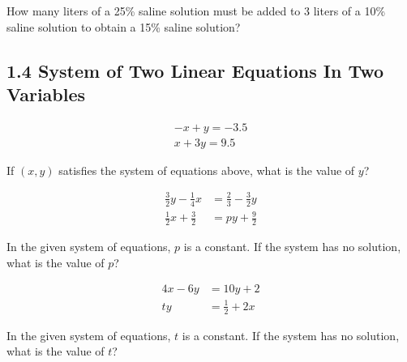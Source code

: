 \noindent\markforreview

\vspace{1em}

How many liters of a 25\% saline solution must be added to 3 liters of a 10\% saline solution to obtain a 15\% saline solution?


\newpage
\subsection*{1.4 System of Two Linear Equations In Two Variables }
\vspace{0.5em}

\setcounter{questionnum}{0}

\noindent\markforreview

\vspace{0.5em}
\[
\begin{aligned}
-x + y = -3.5 \\ 
x + 3y = 9.5
\end{aligned}
  \]


If $(x, y)$ satisfies the system of equations above, what is the value of $y$?


\vspace{5em}
\noindent\markforreview

\vspace{0.5em}

\[
\begin{aligned}
\frac{3}{2}y - \frac{1}{4}x &= \frac{2}{3}-\frac{3}{2}y \\
\frac{1}{2}x + \frac{3}{2} &= py + \frac{9}{2}
\end{aligned}
\]

In the given system of equations, $p$ is a constant. If the system has no solution, what is the value of $p$?


\vspace{5em}
\noindent\markforreview

\vspace{0.5em}

\[
\begin{aligned}
4x - 6y &= 10y + 2 \\
ty &= \frac{1}{2} + 2x
\end{aligned}
\]

In the given system of equations, $t$ is a constant. If the system has no solution, what is the value of $t$?

\newpage
\noindent\markforreview

\vspace{1em}

